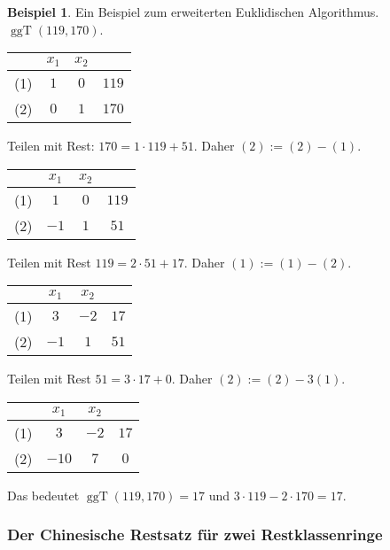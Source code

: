 \documentclass[
a4paper,12pt,
bibliography=totocnumbered,
numbers=noenddot,
]{scrartcl}
\numberwithin{equation}{subsection}
\newcommand{\ggT}{\operatorname{ggT}} %
\theoremstyle{plain}
\theoremstyle{definition}
\newtheorem*{bsp}{Beispiel}
\begin{document}
\begin{bsp} 
	Ein Beispiel zum erweiterten Euklidischen Algorithmus. $\ggT(119,170)$. 
	
	\begin{center}
	\begin{tabular}{c|cc|c}
		& $x_1$ & $x_2$ & 
		\\ \hline 
		(1) & $1$ & $0$ & $119$ 
\\		(2) & $0$  & $1$ & $170$
	\end{tabular}
\end{center}  

	Teilen mit Rest: $170 = 1 \cdot 119 + 51$. Daher $(2) := (2) - (1)$. 
	
	\begin{center}
	\begin{tabular}{c|cc|c}
	& $x_1$ & $x_2$ & 
	\\ \hline 
	(1) & $1$ & $0$ & $119$ 
	\\		(2) & $-1$  & $1$ & $51$
\end{tabular} 
\end{center} 

	Teilen mit Rest $119 =2 \cdot 51 + 17$. Daher $(1):= (1) - (2)$. 
	
	\begin{center}
	\begin{tabular}{c|cc|c}
		& $x_1$ & $x_2$ & 
		\\ \hline 
		(1) & $3$ & $-2$ & $17$ 
		\\		(2) & $-1$  & $1$ & $51$
	\end{tabular} 
\end{center} 

Teilen mit Rest $51 = 3 \cdot 17 + 0$. Daher $(2) := (2) - 3 (1)$. 

	\begin{center}
	\begin{tabular}{c|cc|c}
		& $x_1$ & $x_2$ & 
		\\ \hline 
		(1) & $3$ & $-2$ & $17$ 
		\\		(2) & $-10$  & $7$ & $0$
	\end{tabular} 
\end{center} 

	Das bedeutet $\ggT(119,170) = 17$ und $ 3 \cdot 119 - 2 \cdot 170 = 17$. 


\end{bsp} 


\subsubsection{Der Chinesische Restsatz für zwei Restklassenringe} 
\end{document}
